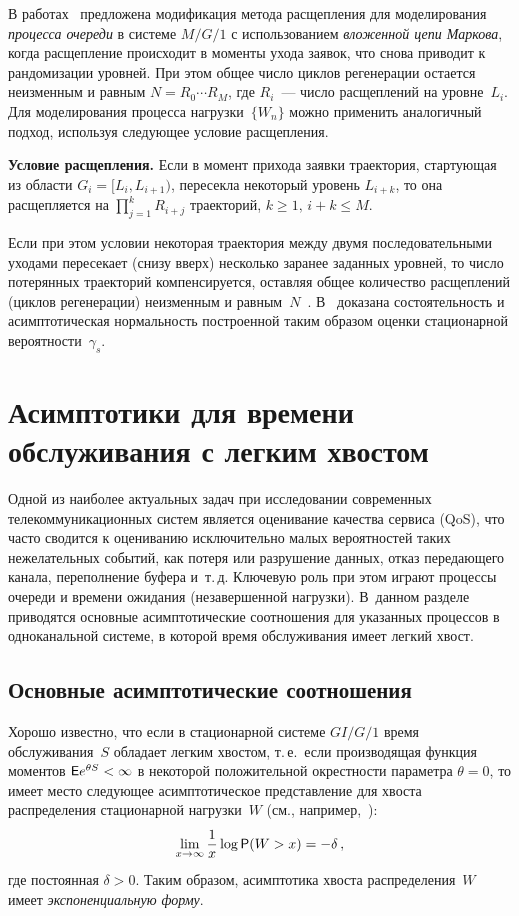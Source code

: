 \begin{multicols}{2}
В работах~\cite{avb7, avb9}  предложена  модификация метода
расщепления для моделирования \textit{процесса очереди} в системе
$M/G/1$ с использованием \textit{вложенной цепи Маркова}, когда
расщепление происходит в моменты ухода заявок, что снова приводит к
рандомизации уровней. При этом общее число цик\-лов регенерации
остается неизменным и равным $N = R_0 \cdots R_{M}$, где $R_i$~---
число расщеплений на уровне~$L_i$.  Для моделирования процесса
нагрузки~$\{W_n\}$ можно применить аналогичный подход, используя
следующее условие расщепления.

\medskip

\noindent
\textbf{Условие расщепления.} Если в момент прихода заявки
траектория, стартующая из области $G_i=[L_i, L_{i+1})$, пересекла
некоторый уровень $L_{i+k}$, то она расщепляется на
$\prod\limits_{j=1}^{k}R_{i+j}$ траекторий, $k \ge 1,\,i+k \le M$.

Если при этом условии  некоторая траектория  между двумя
последовательными уходами  пересекает (снизу вверх) несколько
заранее заданных уровней, то число потерянных траекторий
компенсируется, оставляя общее количество расщеплений (циклов
регенерации) неизменным и равным~$N$~\cite{avb7, avb6,  avb9}. 
В~\cite{diss_2008} доказана состоятельность и асимптотическая
нормальность построенной таким образом  оценки стационарной
вероятности~$\gamma_s$.

\section{Асимптотики для времени обслуживания с легким хвостом}

Одной из наиболее актуальных  задач при исследовании современных
телекоммуникационных  сис\-тем является оценивание  качества сервиса
(QoS), что часто  сводится  к оцениванию исключительно малых
вероятностей таких нежелательных событий, как потеря или разрушение
данных, отказ пе\-ре\-да\-юще\-го канала, переполнение буфера  и~т.\,д.
Ключевую роль при этом играют  процессы очереди  и времени ожидания
(незавершенной нагрузки).  В~данном разделе приводятся основные
асимптотические соотношения для указанных процессов в одноканальной
системе, в которой время обслуживания имеет легкий хвост.

\subsection{Основные асимптотические соотношения}

Хорошо известно, что  если в стационарной  системе $GI/G/1$ время
обслуживания~$S$ обладает  легким хвостом, т.\,е.\ если производящая
функция моментов ${\sf E} e^{\theta S}<\infty$
 в некоторой положительной окрестности параметра $\theta=0$, то
имеет место следующее асимптотическое представление для хвоста
распределения стационарной нагрузки~$W$ (см., например,~\cite{Glynn_Witt_94}):
\begin{equation}
\lim\limits_{x \to \infty}\displaystyle\frac{\displaystyle 1\mathstrut}{\displaystyle x\mathstrut}\log {\sf P}(W > x) = - \delta\,,
\label{tail_asympt}
\end{equation}
где постоянная $\delta>0$. Таким образом, асимптотика хвоста
распределения~$W$ имеет \textit{экспоненциальную форму}.


\end{multicols}
